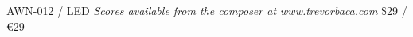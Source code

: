\documentclass{article}
\begin{document}
\null \vfill

AWN-012 / LED \hfill
\textit{Scores available from the composer at www.trevorbaca.com}
\hfill \$29 / \euro 29
\end{document}

